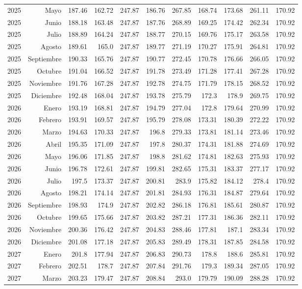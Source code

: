 \documentclass{article}%
\begin{document}
\begin{longtable}{|l r|r|r|r|r|r|r|r|r|r|}
2025&Mayo&187.46&162.72&247.87&186.76&267.85&168.74&173.68&261.11&170.92\\%
2025&Junio&188.18&163.48&247.87&187.76&268.89&169.25&174.42&262.34&170.92\\%
2025&Julio&188.89&164.24&247.87&188.77&270.15&169.76&175.17&263.58&170.92\\%
2025&Agosto&189.61&165.0&247.87&189.77&271.19&170.27&175.91&264.81&170.92\\%
2025&Septiembre&190.33&165.76&247.87&190.77&272.45&170.78&176.66&266.05&170.92\\%
2025&Octubre&191.04&166.52&247.87&191.78&273.49&171.28&177.41&267.28&170.92\\%
2025&Noviembre&191.76&167.28&247.87&192.78&274.75&171.79&178.15&268.52&170.92\\%
2025&Diciembre&192.48&168.04&247.87&193.78&275.79&172.3&178.9&269.75&170.92\\%
2026&Enero&193.19&168.81&247.87&194.79&277.04&172.8&179.64&270.99&170.92\\%
2026&Febrero&193.91&169.57&247.87&195.79&278.08&173.31&180.39&272.22&170.92\\%
2026&Marzo&194.63&170.33&247.87&196.8&279.33&173.81&181.14&273.46&170.92\\%
2026&Abril&195.35&171.09&247.87&197.8&280.37&174.31&181.88&274.69&170.92\\%
2026&Mayo&196.06&171.85&247.87&198.8&281.62&174.81&182.63&275.93&170.92\\%
2026&Junio&196.78&172.61&247.87&199.81&282.65&175.31&183.37&277.17&170.92\\%
2026&Julio&197.5&173.37&247.87&200.81&283.9&175.82&184.12&278.4&170.92\\%
2026&Agosto&198.21&174.14&247.87&201.81&284.93&176.31&184.87&279.64&170.92\\%
2026&Septiembre&198.93&174.9&247.87&202.82&286.18&176.81&185.61&280.87&170.92\\%
2026&Octubre&199.65&175.66&247.87&203.82&287.21&177.31&186.36&282.11&170.92\\%
2026&Noviembre&200.36&176.42&247.87&204.83&288.46&177.81&187.1&283.34&170.92\\%
2026&Diciembre&201.08&177.18&247.87&205.83&289.49&178.31&187.85&284.58&170.92\\%
2027&Enero&201.8&177.94&247.87&206.83&290.73&178.8&188.6&285.81&170.92\\%
2027&Febrero&202.51&178.7&247.87&207.84&291.76&179.3&189.34&287.05&170.92\\%
2027&Marzo&203.23&179.47&247.87&208.84&293.0&179.79&190.09&288.28&170.92\\%

\end{longtable}
\end{document}
